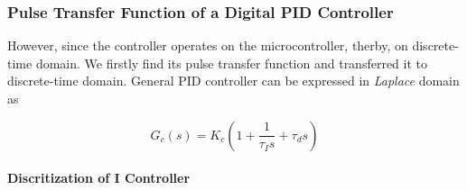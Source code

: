 \documentclass[a4paper,12pt]{article}
\begin{document}
\begin{enumerate}









	\subsubsection*{ Pulse Transfer Function of a Digital PID Controller }

	However, since the controller operates on the microcontroller, therby, on discrete-time domain. We firstly find its pulse transfer function and transferred it to discrete-time domain. General PID controller can be expressed in \textit{Laplace} domain as 
	
	
		$$ G_c(s)=K_c(1+\frac{1}{\tau_I s}+\tau_d s )$$  
		
	
	\paragraph*{ Discritization of I Controller }
	

\end{enumerate}
\end{document}
